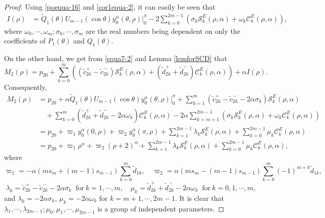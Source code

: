\documentclass[11pt]{amsart}
\theoremstyle{remark}
\theoremstyle{definition}
\begin{document}
\begin{proof}
Using \eqref{poequa-16} and
 \eqref{cor1equa-2}, it can easily be seen that
\begin{equation*} \label{poequa-17}
\begin{split}
I(\rho)&=\tilde{Q}_1(\theta)U_{m-1}(\cos \theta)y_0^{\alpha}(\theta,\rho)\bigg|_{0}^{\pi}-2\sum_{k=0}^{2m-1}\left(\sigma_k\mathcal{S}_{k}^{E}(\rho,\alpha)+\omega_k\mathcal{C}_{k}^{E}(\rho,\alpha)\right),
\end{split}\end{equation*}
  where $\omega_0,\cdots, \omega_{m};\sigma_0,\cdots,\sigma_{m}$ are the real numbers being dependent on only the coefficients of $P_1(\theta)$ and $Q_1(\theta)$.

On the other hand, we get
from  \eqref{equa7-2} and Lemma \ref{lemforSCD} that
$$M_{2}(\rho)=p_{20}+\sum_{k=0}^{m}\left((\tilde{c}_{2k}^{+}-\tilde{c}_{2k}^{-})\mathcal{S}_{k}^{E}(\rho,\alpha)+(\tilde{d}_{2k}^{+}+\tilde{d}_{2k}^{-})\mathcal{C}_{k}^{E}(\rho,\alpha)\right)+\alpha I(\rho).$$
Consequently,
\begin{equation*} \label{poequa-17}\begin{split}
M_{2}(\rho)&=p_{20}+\alpha\tilde{Q}_1(\theta)U_{m-1}(\cos \theta)y_0^{\alpha}(\theta,\rho)\bigg|_{0}^{\pi}+\sum_{k=1}^{m}(\tilde{c}_{2k}^{+}-\tilde{c}_{2k}^{-}-2\alpha \sigma_k)\mathcal{S}_{k}^{E}(\rho,\alpha)\\
&\quad +\sum_{k=0}^{m}(\tilde{d}_{2k}^{+}+\tilde{d}_{2k}^{-}-2\alpha \omega_k)\mathcal{C}_{k}^{E}(\rho,\alpha)
-2\alpha\sum_{k=m+1}^{2m-1}\left(\sigma_k\mathcal{S}_{k}^{E}(\rho,\alpha)+\omega_k\mathcal{C}_{k}^{E}(\rho,\alpha)\right)\\
&=p_{20}+\varpi_1y_0^{\alpha}(0,\rho)+\varpi_2y_0^{\alpha}(\pi,\rho)
+\sum_{k=1}^{2m-1}\lambda_k\mathcal{S}_{k}^{E}(\rho,\alpha)
+\sum_{k=0}^{2m-1}\mu_k\mathcal{C}_{k}^{E}(\rho,\alpha)\\
&=p_{20}+\varpi_1 \rho^{\alpha}+\varpi_2(\rho+2)^{\alpha}
+\sum_{k=1}^{2m-1}\lambda_k\mathcal{S}_{k}^{E}(\rho,\alpha)
+\sum_{k=0}^{2m-1}\mu_k\mathcal{C}_{k}^{E}(\rho,\alpha),\end{split}
\end{equation*}
where $$\varpi_1=-\alpha\left(ms_m+(m-1)s_{m-1}\right)\sum_{k=0}^{m}\tilde{d}_{1k}, \quad  \varpi_2=\alpha(ms_m-(m-1)s_{m-1})\sum_{k=0}^{m}(-1)^{m+k}\tilde{d}_{1k},$$
$$\lambda_k=\tilde{c}_{2k}^{+}-\tilde{c}_{2k}^{-}-2\alpha \sigma_k\ \mbox{ for} \ k=1,\cdots,m, \quad \mu_k=\tilde{d}_{2k}^{+}+\tilde{d}_{2k}^{-}-2\alpha \omega_k \ \mbox{ for} \ k=0,1,\cdots,m,$$   and  $\lambda_k=-2\alpha \sigma_k$, $\mu_k=-2\alpha \omega_k$ for $k=m+1,\cdots, 2m-1$.
It is clear that $ \lambda_1, \cdots,\lambda_{2m-1}; \mu_0, \mu_1, \cdots,\mu_{2m-1}$ is a group of independent parameters.

















\end{proof}
\end{document}
